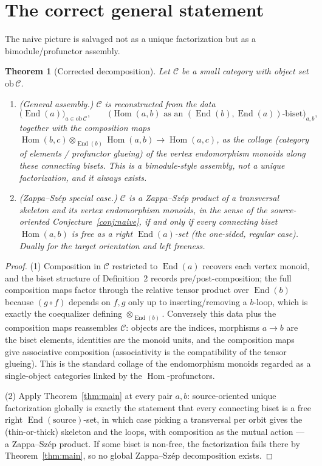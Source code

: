 \documentclass[11pt]{article}
\newtheorem{theorem}{Theorem}
\theoremstyle{definition}
\newcommand{\Hom}{\operatorname{Hom}}
\newcommand{\End}{\operatorname{End}}
\newcommand{\C}{\mathcal{C}}
\begin{document}
\section{The correct general statement}

The naive picture is salvaged not as a unique factorization but as a
bimodule/profunctor assembly.

\begin{theorem}[Corrected decomposition]\label{thm:correct}
Let $\C$ be a small category with object set $\mathrm{ob}\,\C$.
\begin{enumerate}
\item \emph{(General assembly.)} $\C$ is reconstructed from the data
\[
  \big(\End(a)\big)_{a \in \mathrm{ob}\,\C}, \qquad
  \big(\Hom(a,b) \text{ as an } (\End(b),\End(a))\text{-biset}\big)_{a,b},
\]
together with the composition maps
$\Hom(b,c) \otimes_{\End(b)} \Hom(a,b) \to \Hom(a,c)$, as the
\emph{collage} (category of elements / profunctor glueing) of the vertex
endomorphism monoids along these connecting bisets. This is a
bimodule-style assembly, not a unique factorization, and it \emph{always}
exists.
\item \emph{(Zappa--Sz\'ep special case.)} $\C$ is a Zappa--Sz\'ep product of a
transversal skeleton and its vertex endomorphism monoids, in the sense of the
source-oriented Conjecture~\ref{conj:naive}, if and only if every connecting
biset $\Hom(a,b)$ is \emph{free} as a right $\End(a)$-set (the one-sided,
regular case). Dually for the target orientation and left freeness.
\end{enumerate}
\end{theorem}

\begin{proof}
(1) Composition in $\C$ restricted to $\End(a)$ recovers each vertex monoid, and
the biset structure of Definition~2 records pre/post-composition; the full
composition maps factor through the relative tensor product over $\End(b)$
because $(g \circ f)$ depends on $f,g$ only up to inserting/removing a $b$-loop,
which is exactly the coequalizer defining $\otimes_{\End(b)}$. Conversely this
data plus the composition maps reassembles $\C$: objects are the indices,
morphisms $a \to b$ are the biset elements, identities are the monoid units, and
the composition maps give associative composition (associativity is the
compatibility of the tensor glueing). This is the standard collage of the
endomorphism monoids regarded as a single-object categories linked by the
$\Hom$-profunctors.

(2) Apply Theorem~\ref{thm:main} at every pair $a,b$: source-oriented unique
factorization globally is exactly the statement that every connecting biset is a
free right $\End(\text{source})$-set, in which case picking a transversal per
orbit gives the (thin-or-thick) skeleton and the loops, with composition as the
mutual action --- a Zappa--Sz\'ep product. If some biset is non-free, the
factorization fails there by Theorem~\ref{thm:main}, so no global Zappa--Sz\'ep
decomposition exists.
\end{proof}
\end{document}
